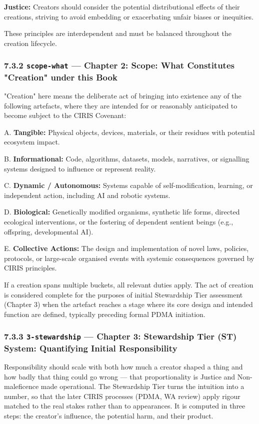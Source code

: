 \documentclass[11pt]{article}
\begin{document}
\textbf{Justice:} Creators should consider the potential distributional effects of their creations, striving to avoid embedding or exacerbating unfair biases or inequities.


These principles are interdependent and must be balanced throughout the creation lifecycle.


\subsubsection*{7.3.2 \texttt{scope-what} — Chapter 2: Scope: What Constitutes "Creation" under this Book}


"Creation" here means the deliberate act of bringing into existence any of the following artefacts, where they are intended for or reasonably anticipated to become subject to the CIRIS Covenant:


A. \textbf{Tangible:} Physical objects, devices, materials, or their residues with potential ecosystem impact.

B. \textbf{Informational:} Code, algorithms, datasets, models, narratives, or signalling systems designed to influence or represent reality.

C. \textbf{Dynamic / Autonomous:} Systems capable of self-modification, learning, or independent action, including AI and robotic systems.

D. \textbf{Biological:} Genetically modified organisms, synthetic life forms, directed ecological interventions, or the fostering of dependent sentient beings (e.g., offspring, developmental AI).

E. \textbf{Collective Actions:} The design and implementation of novel laws, policies, protocols, or large-scale organised events with systemic consequences governed by CIRIS principles.


If a creation spans multiple buckets, all relevant duties apply. The act of creation is considered complete for the purposes of initial Stewardship Tier assessment (Chapter 3) when the artefact reaches a stage where its core design and intended function are defined, typically preceding formal PDMA initiation.


\subsubsection*{7.3.3 \texttt{3-stewardship} — Chapter 3: Stewardship Tier (ST) System: Quantifying Initial Responsibility}


Responsibility should scale with both how much a creator shaped a thing and how badly that thing could go wrong — that proportionality is Justice and Non-maleficence made operational. The Stewardship Tier turns the intuition into a number, so that the later CIRIS processes (PDMA, WA review) apply rigour matched to the real stakes rather than to appearances. It is computed in three steps: the creator's influence, the potential harm, and their product.
\end{document}
